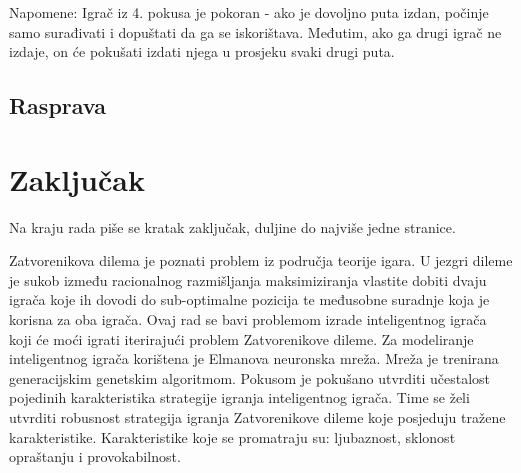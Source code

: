 \documentclass[zavrsnirad]{fer}
\begin{document}
	Napomene: Igrač iz 4. pokusa je pokoran - ako je dovoljno puta izdan, počinje samo surađivati i dopuštati da ga se iskorištava. Međutim, ako ga drugi igrač ne izdaje, on će pokušati izdati njega u prosjeku svaki drugi puta. 

	\section{Rasprava}




\chapter{Zaključak}
\label{pog:zakljucak}

Na kraju rada piše se kratak zaključak, duljine do najviše jedne stranice. 








\begin{sazetak}
	
	Zatvorenikova dilema je poznati problem iz područja teorije igara. U jezgri dileme je sukob između racionalnog razmišljanja maksimiziranja vlastite dobiti dvaju igrača koje ih dovodi do sub-optimalne pozicija te međusobne suradnje koja je korisna za oba igrača. Ovaj rad se bavi problemom izrade inteligentnog igrača koji će moći igrati iterirajući problem Zatvorenikove dileme. Za modeliranje inteligentnog igrača korištena je Elmanova neuronska mreža. Mreža je trenirana generacijskim genetskim algoritmom. Pokusom je pokušano utvrditi učestalost pojedinih karakteristika strategije igranja inteligentnog igrača. Time se želi utvrditi robusnost strategija igranja Zatvorenikove dileme koje posjeduju tražene karakteristike. Karakteristike koje se promatraju su: ljubaznost, sklonost opraštanju i provokabilnost.

\end{sazetak}
\end{document}

